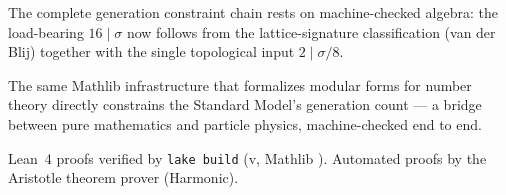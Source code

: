 \documentclass[aps,prl,twocolumn,superscriptaddress]{revtex4-2}
\begin{document}
The complete generation constraint chain rests on machine-checked algebra:
the load-bearing $16 \mid \sigma$ now follows from the lattice-signature
classification (van der Blij) together with the single topological input
$2 \mid \sigma/8$.

The same Mathlib infrastructure that formalizes modular forms for number
theory directly constrains the Standard Model's generation count ---
a bridge between pure mathematics and particle physics, machine-checked
end to end.

\begin{acknowledgments}
Lean~4 proofs verified by \texttt{lake build}
(v\leantoolchain{}, Mathlib \texttt{\mathlibrev{}}).
Automated proofs by the Aristotle theorem prover (Harmonic).
\end{acknowledgments}
\end{document}
